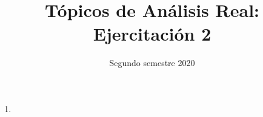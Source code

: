 \documentclass[11pt]{article}
\title{ Tópicos de Análisis Real: Ejercitación 2}
\date{ Segundo semestre 2020 }
\begin{document}
\maketitle
\begin{enumerate}
  \item 
\end{enumerate}
\end{document}
